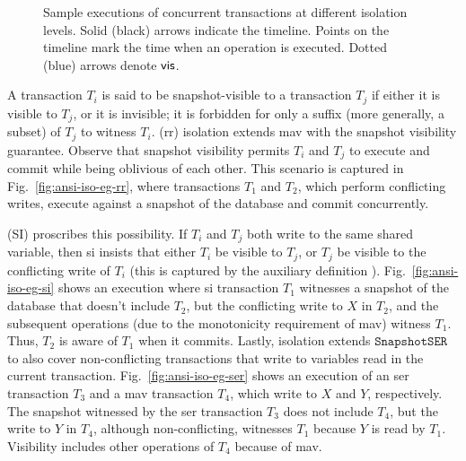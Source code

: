 \begin{figure}
\caption{Sample executions of concurrent transactions at different
isolation levels. Solid (black) arrows indicate the timeline. Points
on the timeline mark the time when an operation is executed. Dotted
(blue) arrows denote $\textsf{vis}$. }
\label{fig:ansi-iso-eg}
\end{figure}

A transaction $T_i$ is said to be snapshot-visible to a transaction
$T_j$ if either it is visible to $T_j$, or it is invisible; it is
forbidden for only a suffix (more generally, a subset) of $T_j$ to
witness $T_i$.   ({\sc rr})
isolation extends {\sc mav} with the snapshot visibility guarantee.
Observe that snapshot visibility permits $T_i$ and $T_j$ to execute
and commit while being oblivious of each other. This scenario is
captured in Fig.~\ref{fig:ansi-iso-eg-rr}, where transactions $T_1$
and $T_2$, which perform conflicting writes, execute against a
snapshot of the database and commit concurrently. 

 ({\sc SI}) proscribes this possibility. If
$T_i$ and $T_j$ both write to the same shared variable, then {\sc si}
insists that either $T_i$ be visible to $T_j$, or $T_j$ be visible to
the conflicting write of $T_i$ (this is captured by the auxiliary
definition ). Fig.~\ref{fig:ansi-iso-eg-si} shows an
execution where {\sc si} transaction $T_1$ witnesses a snapshot of the
database that doesn't include $T_2$, but the conflicting write to $X$
in $T_2$, and the subsequent operations (due to the monotonicity
requirement of {\sc mav}) witness $T_1$. Thus, $T_2$ is aware of $T_1$
when it commits. Lastly,  isolation extends
$\mathtt{SnapshotSER}$ to also cover non-conflicting transactions that
write to variables read in the current transaction.
Fig.~\ref{fig:ansi-iso-eg-ser} shows an execution of an {\sc ser}
transaction $T_3$ and a {\sc mav transaction} $T_4$, which write to $X$
and $Y$, respectively. The snapshot witnessed by the {\sc ser}
transaction $T_3$ does not include $T_4$, but the write to $Y$ in
$T_4$, although non-conflicting, witnesses $T_1$ because $Y$ is read
by $T_1$. Visibility includes other operations of $T_4$ because of
{\sc mav}.


